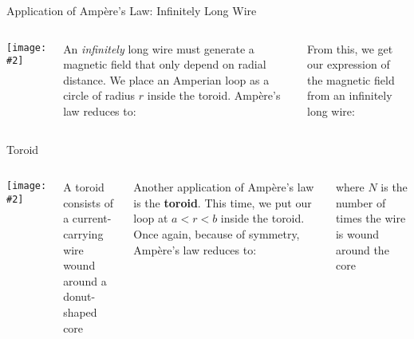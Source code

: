 \documentclass[12pt,aspectratio=169]{beamer}
\newcommand{\pic}[2]{\texttt{[image: \#2]}}
\newcommand{\eq}[2]{\vspace{#1}{\Large\begin{displaymath}#2\end{displaymath}}}
\begin{document}
\begin{frame}{Application of Amp\`{e}re's Law: Infinitely Long Wire}
  \begin{columns}
    \pic{1}{4iM3O}

    An \emph{infinitely} long wire must generate a magnetic field that only
    depend on radial distance. We place an Amperian loop as a circle of radius
    $r$ inside the toroid. Amp\`{e}re's law reduces to:

    \eq{-.3in}{
      \oint_C \bm{B}\cdot d\boldsymbol{\ell}=\mu_0 I_C
      \;\rightarrow\;
      B(2\pi r)=\mu_0 I
    }
      
    From this, we get our expression of the magnetic field from an infinitely
    long wire:
      
    \eq{-.2in}{
      B=\frac{\mu_0 I}{2\pi r}
    }
  \end{columns}
\end{frame}



\begin{frame}{Toroid}
  \begin{columns}
    \pic{1.1}{toroid}

    {\scriptsize A toroid consists of a current-\\
      carrying wire wound around a donut-shaped core \par}
    
    Another application of Amp\`{e}re's law is the \textbf{toroid}. This time,
    we put our loop at $a<r<b$ inside the toroid. Once again, because of
    symmetry, Amp\`{e}re's law reduces to:


    \vspace{-.15in}where $N$ is the number of times the wire is wound around
    the core
    
  \end{columns}
\end{frame}
\end{document}
